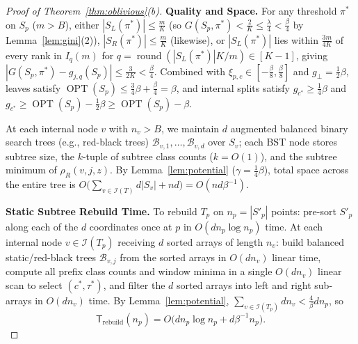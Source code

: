 \documentclass[11pt]{article}
\theoremstyle{definition}
\newcommand{\calB}{\mathcal{B}}
\newcommand{\calI}{\mathcal{I}}
\newcommand{\OPT}{\operatorname{OPT}}
\begin{document}
\begin{proof}[Proof of Theorem~\ref{thm:oblivious}(b)]
\textbf{Quality and Space.}
For any threshold $\pi^*$ on $S_p$ ($m > B$), either $|S_L(\pi^*)| \le \frac{m}{K}$ (so $G(S_p, \pi^*) < \frac{2}{K} \le \frac{\lambda}{4} < \frac{\beta}{4}$ by Lemma~\ref{lem:gini}(2)), $|S_R(\pi^*)| \le \frac{m}{K}$ (likewise), or $|S_L(\pi^*)|$ lies within $\frac{3m}{4K}$ of every rank in $I_q(m)$ for $q = \operatorname{round}(|S_L(\pi^*)| K / m) \in [K-1]$, giving $|G(S_p, \pi^*) - g_{j, q}(S_p)| \le \frac{3}{2K} < \frac{\beta}{4}$. Combined with $\xi_{p, c} \in [-\frac{\beta}{8}, \frac{\beta}{8}]$ and $g_\bot = \frac{1}{2}\beta$, leaves satisfy $\OPT(S_p) \le \frac{3}{4}\beta + \frac{\beta}{4} = \beta$, and internal splits satisfy $g_{c^*} \ge \frac{1}{4}\beta$ and $g_{c^*} \ge \OPT(S_p) - \frac{1}{2}\beta \ge \OPT(S_p) - \beta$.

At each internal node $v$ with $n_v > B$, we maintain $d$ augmented balanced binary search trees (e.g., red-black trees) $\calB_{v, 1}, \dots, \calB_{v, d}$ over $S_v$; each BST node stores subtree size, the $k$-tuple of subtree class counts ($k = O(1)$), and the subtree minimum of $\rho_R(v, j, z)$. By Lemma~\ref{lem:potential} ($\gamma = \frac{1}{4}\beta$), total space across the entire tree is $O\big(\sum_{v \in \calI(T)} d |S_v| + nd\big) = O(nd\beta^{-1})$.

\textbf{Static Subtree Rebuild Time.}
To rebuild $T_p$ on $n_p = |S'_p|$ points: pre-sort $S'_p$ along each of the $d$ coordinates once at $p$ in $O(d n_p \log n_p)$ time. At each internal node $v \in \calI(T_p)$ receiving $d$ sorted arrays of length $n_v$: build balanced static/red-black trees $\calB_{v, j}$ from the sorted arrays in $O(d n_v)$ linear time, compute all prefix class counts and window minima in a single $O(d n_v)$ linear scan to select $(c^*, \tau^*)$, and filter the $d$ sorted arrays into left and right sub-arrays in $O(d n_v)$ time. By Lemma~\ref{lem:potential}, $\sum_{v \in \calI(T_p)} d n_v < \frac{4}{\beta} d n_p$, so
\[
    \mathsf{T}_{\mathrm{rebuild}}(n_p) = O\big(d n_p \log n_p + d \beta^{-1} n_p\big).
\]


\end{proof}
\end{document}
